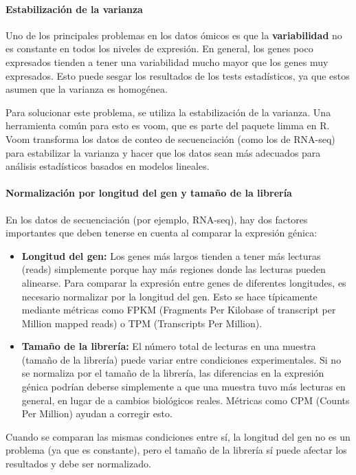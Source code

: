 \paragraph{Estabilización de la varianza} Uno de los principales problemas en los datos ómicos es que la \textbf{variabilidad} no es constante en todos los niveles de expresión. En general, los genes poco expresados tienden a tener una variabilidad mucho mayor que los genes muy expresados. Esto puede sesgar los resultados de los tests estadísticos, ya que estos asumen que la varianza es homogénea.

Para solucionar este problema, se utiliza la estabilización de la varianza. Una herramienta común para esto es voom, que es parte del paquete limma en R. Voom transforma los datos de conteo de secuenciación (como los de RNA-seq) para estabilizar la varianza y hacer que los datos sean más adecuados para análisis estadísticos basados en modelos lineales.

\paragraph{Normalización por longitud del gen y tamaño de la librería} En los datos de secuenciación (por ejemplo, RNA-seq), hay dos factores importantes que deben tenerse en cuenta al comparar la expresión génica:
\begin{itemize}
\item \textbf{Longitud del gen:} Los genes más largos tienden a tener más lecturas (reads) simplemente porque hay más regiones donde las lecturas pueden alinearse. Para comparar la expresión entre genes de diferentes longitudes, es necesario normalizar por la longitud del gen. Esto se hace típicamente mediante métricas como FPKM (Fragments Per Kilobase of transcript per Million mapped reads) o TPM (Transcripts Per Million).
\item \textbf{Tamaño de la librería:} El número total de lecturas en una muestra (tamaño de la librería) puede variar entre condiciones experimentales. Si no se normaliza por el tamaño de la librería, las diferencias en la expresión génica podrían deberse simplemente a que una muestra tuvo más lecturas en general, en lugar de a cambios biológicos reales. Métricas como CPM (Counts Per Million) ayudan a corregir esto.
\end{itemize}

Cuando se comparan las mismas condiciones entre sí, la longitud del gen no es un problema (ya que es constante), pero el tamaño de la librería sí puede afectar los resultados y debe ser normalizado.

